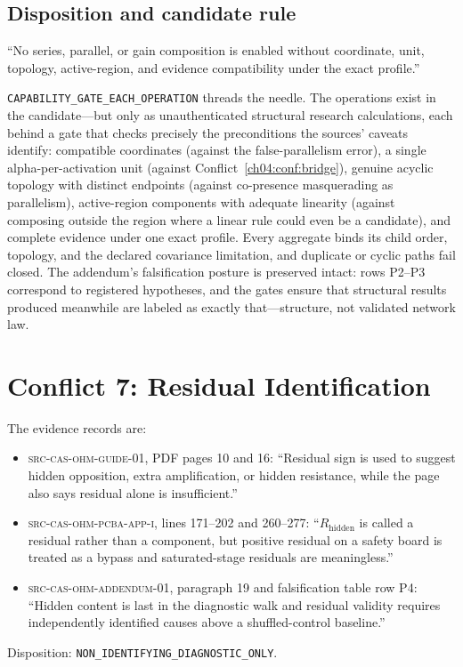 \subsection{Disposition and candidate rule}

\begin{ruleenv}\label{ch04:rule:networks}
``No series, parallel, or gain composition is enabled without coordinate,
unit, topology, active-region, and evidence compatibility under the exact
profile.''
\end{ruleenv}

\texttt{CAPABILITY\_GATE\_EACH\_OPERATION} threads the needle. The
operations exist in the candidate---but only as unauthenticated structural
research calculations, each behind a gate that checks precisely the
preconditions the sources' caveats identify: compatible coordinates (against
the false-parallelism error), a single alpha-per-activation unit (against
Conflict~\ref{ch04:conf:bridge}), genuine acyclic topology with distinct
endpoints (against co-presence masquerading as parallelism), active-region
components with adequate linearity (against composing outside the region
where a linear rule could even be a candidate), and complete evidence under
one exact profile. Every aggregate binds its child order, topology, and the
declared covariance limitation, and duplicate or cyclic paths fail closed.
The addendum's falsification posture is preserved intact: rows P2--P3
correspond to registered hypotheses, and the gates ensure that structural
results produced meanwhile are labeled as exactly that---structure, not
validated network law.

\section{Conflict 7: Residual Identification}\label{ch04:residual}

\begin{conflict}\label{ch04:conf:residual}
The evidence records are:
\begin{itemize}
\item \textsc{src-cas-ohm-guide-01}, PDF pages 10 and 16: ``Residual sign is
used to suggest hidden opposition, extra amplification, or hidden resistance,
while the page also says residual alone is insufficient.''
\item \textsc{src-cas-ohm-pcba-app-i}, lines 171--202 and 260--277:
``$R_{\mathrm{hidden}}$ is called a residual rather than a component, but
positive residual on a safety board is treated as a bypass and
saturated-stage residuals are meaningless.''
\item \textsc{src-cas-ohm-addendum-01}, paragraph 19 and falsification table
row P4: ``Hidden content is last in the diagnostic walk and residual validity
requires independently identified causes above a shuffled-control baseline.''
\end{itemize}
Disposition: \texttt{NON\_IDENTIFYING\_DIAGNOSTIC\_ONLY}.
\end{conflict}

